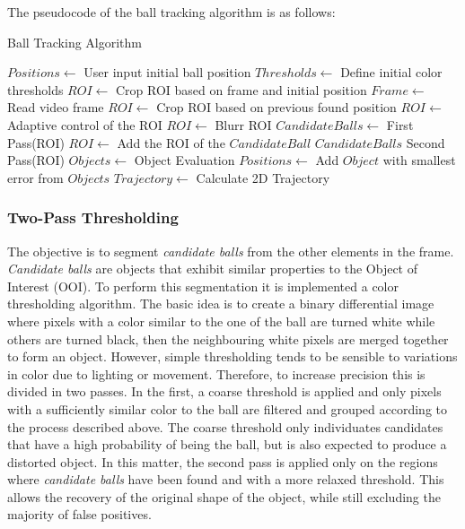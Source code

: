 \documentclass[a4paper]{article}
\begin{document}
The pseudocode of the ball tracking algorithm is as follows:
\begin{algorithm}[H]
\caption{Ball Tracking Algorithm}
\begin{algorithmic}
    \State $ Positions \gets$ User input initial ball position
    \State $ Thresholds \gets$ Define initial color thresholds
    \State $ ROI \gets$ Crop ROI based on frame and initial position
    \State $ Frame \gets$ Read video frame
		\State $ROI \gets$ Crop ROI based on previous found position
\Else{}
	\State $ ROI \gets$ Adaptive control of the ROI
\EndIf
\State $ ROI \gets$ Blurr ROI 
\State $ Candidate Balls \gets$ First Pass(ROI) 
		\State $ROI \gets$ Add the ROI of the $CandidateBall$
	\EndFor
\State $Candidate Balls$ Second Pass(ROI) 
\State $Objects \gets$ Object Evaluation
\State $Positions \gets$ Add $Object$ with smallest error from $Objects$
\EndIf
\EndWhile
\State $Trajectory \gets$ Calculate 2D Trajectory
\end{algorithmic}
\end{algorithm}


\subsubsection{Two-Pass Thresholding}

The objective is to segment \textit{candidate balls} from the other elements in the frame. \textit{Candidate balls} are objects that exhibit similar properties to the Object of Interest (OOI). To perform this segmentation it is implemented a color thresholding algorithm. The basic idea is to create a binary differential image where pixels with a color similar to the one of the ball are turned white while others are turned black, then the neighbouring white pixels are merged together to form an object. However, simple thresholding tends to be sensible to variations in color due to lighting or movement. Therefore, to increase precision this is divided in two passes. In the first, a coarse threshold is applied and only pixels with a sufficiently similar color to the ball are filtered and grouped according to the process described above. The coarse threshold only individuates candidates that have a high probability of being the ball, but is also expected to produce a distorted object. In this matter, the second pass is applied only on the regions where \textit{candidate balls} have been found and with a more relaxed threshold. This allows the recovery of the original shape of the object, while still excluding the majority of false positives.
\end{document}
